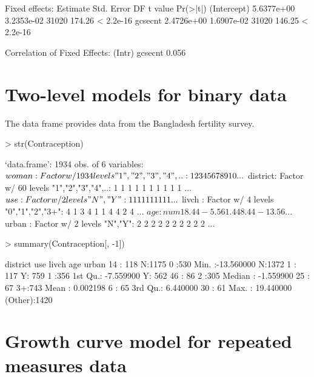 \documentclass[12pt]{article}
\begin{document}
\begin{Schunk}
\begin{Soutput}
Fixed effects:
              Estimate Std. Error    DF t value  Pr(>|t|)
(Intercept) 5.6377e+00 3.2353e-02 31020  174.26 < 2.2e-16
gcsecnt     2.4726e+00 1.6907e-02 31020  146.25 < 2.2e-16

Correlation of Fixed Effects:
        (Intr)
gcsecnt 0.056 
\end{Soutput}
\end{Schunk}


\section{Two-level models for binary data}
\label{sec:TwolevelBinary}

The data frame  provides data from the
Bangladesh fertility survey.
\begin{Schunk}
\begin{Sinput}
> str(Contraception)
\end{Sinput}
\begin{Soutput}
`data.frame':	1934 obs. of  6 variables:
 $ woman   : Factor w/ 1934 levels "1","2","3","4",..: 1 2 3 4 5 6 7 8 9 10 ...
 $ district: Factor w/ 60 levels "1","2","3","4",..: 1 1 1 1 1 1 1 1 1 1 ...
 $ use     : Factor w/ 2 levels "N","Y": 1 1 1 1 1 1 1 1 1 1 ...
 $ livch   : Factor w/ 4 levels "0","1","2","3+": 4 1 3 4 1 1 4 4 2 4 ...
 $ age     : num   18.44  -5.56   1.44   8.44 -13.56 ...
 $ urban   : Factor w/ 2 levels "N","Y": 2 2 2 2 2 2 2 2 2 2 ...
\end{Soutput}
\begin{Sinput}
> summary(Contraception[, -1])
\end{Sinput}
\begin{Soutput}
    district    use      livch         age             urban   
 14     : 118   N:1175   0 :530   Min.   :-13.560000   N:1372  
 1      : 117   Y: 759   1 :356   1st Qu.: -7.559900   Y: 562  
 46     :  86            2 :305   Median : -1.559900           
 25     :  67            3+:743   Mean   :  0.002198           
 6      :  65                     3rd Qu.:  6.440000           
 30     :  61                     Max.   : 19.440000           
 (Other):1420                                                  
\end{Soutput}
\end{Schunk}


\section{Growth curve model for repeated measures data}
\label{sec:GrowthCurve}
\end{document}
